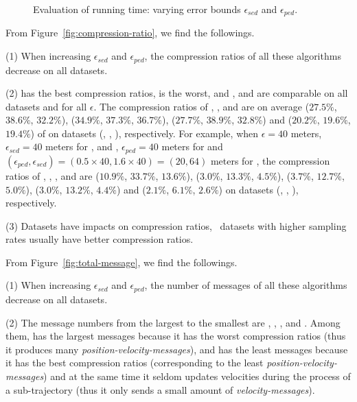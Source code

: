 {{\begin{figure}[tb!]
	\vspace{-2ex}
	\caption{\small Evaluation of running time: varying error bounds $\epsilon_{sed}$ and $\epsilon_{ped}$.}
	\label{fig:running-time}
	\vspace{-2ex}
\end{figure}


 From Figure~\ref{fig:compression-ratio}, we find the followings.

\ni (1) When increasing $\epsilon_{sed}$ and $\epsilon_{ped}$, the compression ratios of all these algorithms decrease on all datasets.

\ni (2) \sitt has the best compression ratios, \ldrh is the worst, and \grts, \citt and \bitt are comparable on all datasets and for all $\epsilon$.
The compression ratios of \grts, \bitt,  \citt and \sitt are on average {($27.5\%$, $38.6\%$, $32.2\%$), ($34.9\%$, $37.3\%$, $36.7\%$), ($27.7\%$, $38.9\%$, $32.8\%$) and ($20.2\%$, $19.6\%$, $19.4\%$)} of \ldrh on datasets (\mopsi, \sercar, \geolife), respectively.
For example, when $\epsilon = 40$ meters, \ie~$\epsilon_{sed} = 40$ meters for \ldrh, \grts and \citt, $\epsilon_{ped} = 40$ meters for \sitt and {$(\epsilon_{ped}, \epsilon_{sed}) = (0.5\times 40, 1.6\times 40)=(20, 64)$} meters for \bitt, the compression ratios of \ldrh, \grts, \bitt, \citt and \sitt are
{($10.9\%$, $33.7\%$, $13.6\%$), ($3.0\%$, $13.3\%$, $4.5\%$), {($3.7\%$, $12.7\%$, $5.0\%$)}, ($3.0\%$, $13.2\%$, $4.4\%$) and ($2.1\%$, $6.1\%$, $2.6\%$)} on  {datasets (\mopsi, \sercar, \geolife)}, respectively. 

\ni (3) Datasets have impacts on compression ratios, \ie~datasets with higher sampling rates usually have better compression ratios.
	


 From Figure~\ref{fig:total-message}, we find the followings.


\ni (1) When increasing $\epsilon_{sed}$ and $\epsilon_{ped}$, the number of messages of all these algorithms decrease on all datasets.

\ni (2) The message numbers from the largest to the smallest are \ldrh, \grts, \citt, \bitt and \sitt. Among them, \ldrh has the largest messages because it has the worst compression ratios (thus it produces many \emph{position-velocity-messages}), and \sitt has the least messages because it has the best compression ratios (corresponding to the least \emph{position-velocity-messages}) and at the same time it seldom updates velocities during the process of a sub-trajectory (thus it only sends a small amount of \emph{velocity-messages}).

}}
